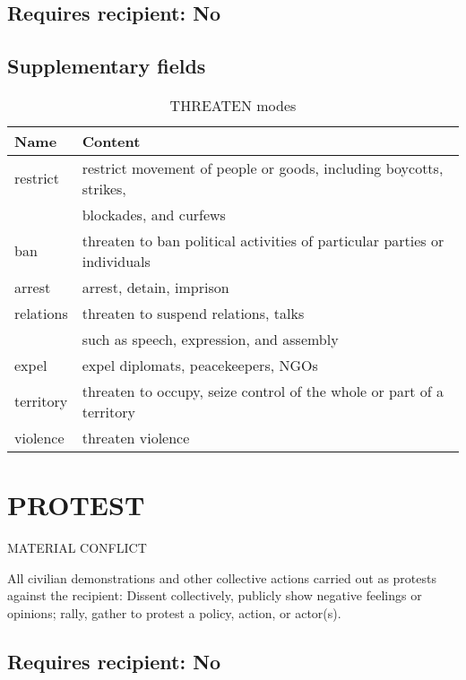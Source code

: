 \documentclass[11pt]{report}
\begin{document}
\subsection{Requires recipient: No}

\subsection{Supplementary fields}

\begin{table}[htp]
\caption{THREATEN modes}
\begin{center}
\begin{tabular}{|l|l|}
\hline
Name & Content \\
\hline
restrict & restrict movement of people or goods, including boycotts, strikes,  \\
& blockades, and curfews \\
ban & threaten to ban political activities of particular parties or individuals \\
arrest & arrest, detain, imprison \\
relations & threaten to suspend relations, talks \\
& such as speech, expression, and assembly\\
expel & expel diplomats, peacekeepers, NGOs \\
territory & threaten to occupy, seize control of the whole or part of a territory \\
violence & threaten violence \\
\hline
\end{tabular}
\end{center}
\label{tab:threatmode}
\end{table}%



\newpage  


\section{PROTEST}

\textsf{MATERIAL CONFLICT} \vspace{8pt}

All civilian demonstrations and other collective actions carried out as protests against the recipient: Dissent collectively, publicly show negative feelings or opinions; rally, gather to protest a policy, action, or actor(s).

\subsection{Requires recipient: No}
\end{document}
